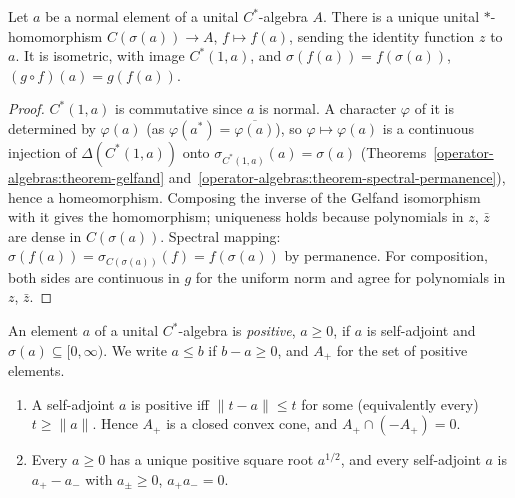 \begin{theorem}\label{operator-algebras:theorem-functional-calculus}
Let $a$ be a normal element of a unital $C^*$-algebra $A$. There is a unique unital $*$-homomorphism $C(\sigma(a)) \to A$, $f \mapsto f(a)$, sending the identity function $z$ to $a$. It is isometric, with image $C^*(1, a)$,
and $\sigma(f(a)) = f(\sigma(a))$, $(g \circ f)(a) = g(f(a))$.
\end{theorem}

\begin{proof}
$C^*(1, a)$ is commutative since $a$ is normal. A character $\varphi$ of it is determined by $\varphi(a)$ (as $\varphi(a^*) = \overline{\varphi(a)}$), so $\varphi \mapsto \varphi(a)$ is a continuous injection of $\Delta(C^*(1, a))$
onto $\sigma_{C^*(1,a)}(a) = \sigma(a)$ (Theorems~\ref{operator-algebras:theorem-gelfand} and~\ref{operator-algebras:theorem-spectral-permanence}), hence a homeomorphism. Composing the inverse of the Gelfand isomorphism with
it gives the homomorphism; uniqueness holds because polynomials in $z$, $\bar z$ are dense in $C(\sigma(a))$. Spectral mapping: $\sigma(f(a)) = \sigma_{C(\sigma(a))}(f) = f(\sigma(a))$ by permanence. For composition, both sides
are continuous in $g$ for the uniform norm and agree for polynomials in $z$, $\bar z$.
\end{proof}

\begin{definition}\label{operator-algebras:definition-positive}
An element $a$ of a unital $C^*$-algebra is \emph{positive}, $a \geq 0$, if $a$ is self-adjoint and $\sigma(a) \subseteq [0, \infty)$. We write $a \leq b$ if $b - a \geq 0$, and $A_+$ for the set of positive elements.
\end{definition}

\begin{lemma}\label{operator-algebras:lemma-positive-cone}
\begin{enumerate}
\item A self-adjoint $a$ is positive iff $\|t - a\| \leq t$ for some (equivalently every) $t \geq \|a\|$. Hence $A_+$ is a closed convex cone, and $A_+ \cap (-A_+) = 0$.
\item Every $a \geq 0$ has a unique positive square root $a^{1/2}$, and every self-adjoint $a$ is $a_+ - a_-$ with $a_\pm \geq 0$, $a_+a_- = 0$.
\end{enumerate}
\end{lemma}

